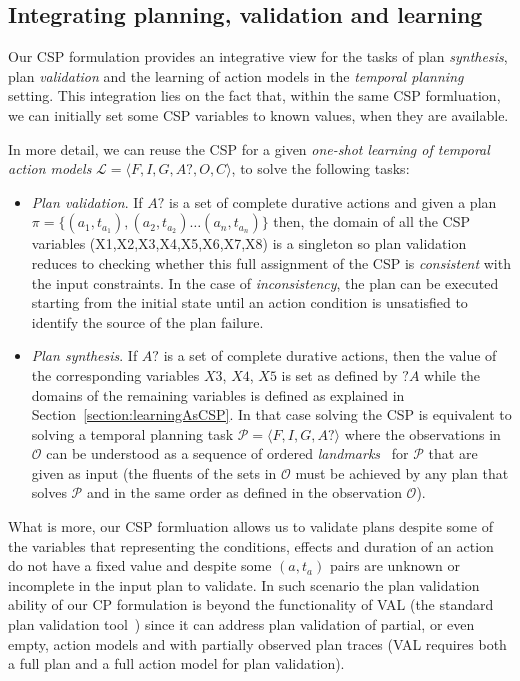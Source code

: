 \documentclass{ecai}
\newcommand{\tup}[1]{{\langle #1 \rangle}}
\begin{document}
\subsection{Integrating planning, validation and learning}
Our CSP formulation provides an integrative view for the tasks of plan {\em synthesis}, plan {\em validation} and the learning of action models in the {\em temporal planning} setting. This integration lies on the fact that, within the same CSP formluation, we can initially set some CSP variables to known values, when they are available.

In more detail, we can reuse the CSP for a given {\em one-shot learning of temporal action models} $\mathcal{L}=\tup{F,I,G,A?,O,C}$, to solve the following tasks:
\begin{itemize}
\item {\em Plan validation}. If $A?$ is a set of complete durative actions and given a plan $\pi=\{(a_1,t_{a_1}),(a_2,t_{a_2})\ldots (a_n,t_{a_n})\}$ then, the domain of all the CSP variables (X1,X2,X3,X4,X5,X6,X7,X8) is a singleton so plan validation reduces to checking whether this full assignment of the CSP is {\em consistent} with the input constraints. In the case of {\em inconsistency}, the plan can be executed starting from the initial state until an action condition is unsatisfied to identify the source of the plan failure.
\item {\em Plan synthesis}. If $A?$ is a set of complete durative actions, then the value of the corresponding variables $X3$, $X4$, $X5$ is set as defined by $?A$ while the domains of the remaining variables is defined as explained in Section~\ref{section:learningAsCSP}. In that case solving the CSP is equivalent to solving a temporal planning task $\mathcal{P}=\tup{F,I,G,A?}$ where the observations in $\mathcal{O}$ can be understood as a sequence of ordered {\em landmarks}~\cite{hoffmann2004ordered} for $\mathcal{P}$ that are given as input (the fluents of the sets in $\mathcal{O}$ must be achieved by any plan that solves $\mathcal{P}$ and in the same order as defined in the observation $\mathcal{O}$).

\end{itemize}  
What is more, our CSP formluation allows us to validate plans despite some of the variables that representing the conditions, effects and duration of an action do not have a fixed value and despite some $(a,t_{a})$ pairs are unknown or incomplete in the input plan to validate. In such scenario the plan validation ability of our CP formulation is beyond the functionality of VAL (the standard plan validation tool~\cite{howey2004val}) since it can address plan validation of partial, or even empty, action models and with partially observed plan traces (VAL requires both a full plan and a full action model for plan validation).
\end{document}
